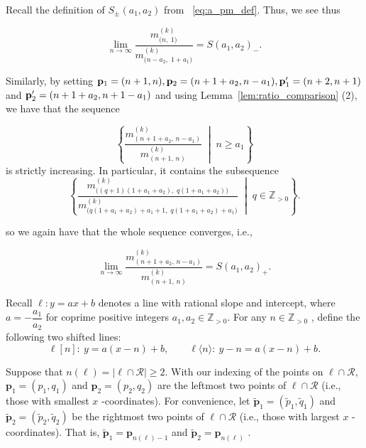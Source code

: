 \documentclass{article}
\theoremstyle{remark}
\begin{document}
Recall the definition of $S_\pm(a_1,a_2)$ from~ \eqref{eq:a_pm_def}. Thus, we see thus

\begin{equation}\label{eq:limits-}
\lim_{n\to \infty}\frac{m^{(k)}_{\bigl(n,\; 1\bigr)}}{m^{(k)}_{\bigl(n-a_2,\; 1+a_1\bigr)}}=S(a_1,a_2)_-.
\end{equation}


Similarly, by setting  ${\bf p}_1=(n+1,n), {\bf p}_2=(n+1+a_2,n-a_1), {\bf p}'_1=(n+2,n+1)$ and ${\bf p}'_2=(n+1+a_2,n+1-a_1)$ and using Lemma~\ref{lem:ratio_comparison} (2), we have that the sequence
 
$$\left\{ \frac{m^{(k)}_{(n+1+a_2,\,n-a_1)}}{m^{(k)}_{(n+1,\,n)}} \;\middle|\; n \geq a_1 \right\}
$$
is strictly increasing. In particular, it contains the subsequence
$$
\left\{  \frac{m^{(k)}_{\bigl((q+1)(1+a_1+a_2),\; q(1+a_1+a_2)\bigr)}}{m^{(k)}_{\bigl(q(1+a_1+a_2)+a_1+1,\; q(1+a_1+a_2)+a_1\bigr)}} \;\middle|\; q \in \mathbb{Z}_{>0} \right\}.
$$

so we again have that the whole sequence converges, i.e., 

\begin{equation}\label{eq:limits+}
\lim_{n\to \infty}\frac{m^{(k)}_{(n+1+a_2,\,n-a_1)}}{m^{(k)}_{(n+1,\,n)}} =S(a_1,a_2)_+.
\end{equation}


Recall $\ell: y = ax + b$  denotes a line with rational slope and intercept, where  $ a = -\dfrac{a_1}{a_2} $  for coprime positive integers  $ a_1, a_2 \in \mathbb{Z}_{>0} $.  For any  $ n \in \mathbb{Z}_{>0} $ , define the following two shifted lines:
\begin{equation*}
    \ell[n]:\ y = a(x - n) + b, \qquad 
    \ell\langle n\rangle:\ y - n = a(x - n) + b.
\end{equation*}

Suppose that $n(\ell)=|\ell\cap \mathcal R|\geq 2$. With our indexing of the points on $\ell \cap \mathcal{R}$,  $\mathbf{p}_1 = (p_1, q_1) $  and  $\mathbf{p}_2=(p_2, q_2)$  are the leftmost two points of  $\ell \cap \mathcal{R}$  (i.e., those with smallest  $ x $ -coordinates). For convenience, let $ \widetilde{\mathbf{p}}_1 = (\widetilde{p}_1, \widetilde{q}_1) $  and  $ \widetilde{\mathbf{p}}_2 = (\widetilde{p}_2, \widetilde{q}_2) $  be the rightmost two points of  $ \ell \cap \mathcal{R} $  (i.e., those with largest  $ x $ -coordinates). That is, $\widetilde{\mathbf{p}}_1 = \mathbf{p}_{n(\ell) - 1}$ and  $\widetilde{\mathbf{p}}_2 = \mathbf{p}_{n(\ell)}$ .
\end{document}
